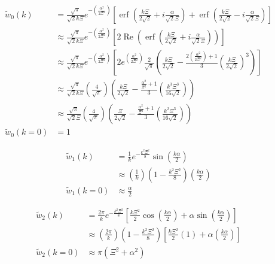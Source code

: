 \documentclass[double,12pt]{revtex4-2}
\begin{document}
\begin{align}
    \widetilde{w}_0(k) &= \frac{\sqrt{\pi}}{\sqrt{2}k\Xi}e^{-\left(
    \frac{\alpha^2}{2\Xi^2}\right)}\left[\operatorname{erf}
    \left(\frac{k\Xi}{2\sqrt{2}}+i\frac{\alpha}{\sqrt{2}\Xi}\right)
    +\operatorname{erf}\left(\frac{k\Xi}{2\sqrt{2}}-i\frac{\alpha}
    {\sqrt{2}\Xi}\right)\right] \\
    & \approx   \frac{\sqrt{\pi}}{\sqrt{2}k\Xi}e^{-\left(\frac{\alpha^2}
    {2\Xi^2}\right)}\left[2\operatorname{Re}\left(\operatorname{erf}
    \left(\frac{k\Xi}{2\sqrt{2}}+i\frac{\alpha}{\sqrt{2}\Xi}\right)
    \right)\right] \\
    & \approx   \frac{\sqrt{\pi}}{\sqrt{2}k\Xi}e^{-\left(\frac{\alpha^2}
    {2\Xi^2}\right)}\left[2e^{\left(\frac{\alpha^2}{2\Xi^2}\right)}
    \frac{2}{\sqrt{\pi}}\left(\frac{k\Xi}{2\sqrt{2}} -\frac{2\left(
    \frac{\alpha^2}{2\Xi^2}\right)+1}{3}\left(\frac{k\Xi}{2\sqrt{2}}
    \right)^3\right)\right] \\
    & \approx   \frac{\sqrt{\pi}}{\sqrt{2}k\Xi}\left(\frac{4}{\sqrt{\pi}}
    \right)\left(\frac{k\Xi}{2\sqrt{2}} -\frac{\frac{\alpha^2}{\Xi^2}+1}
    {3}\left(\frac{k^3\Xi^3}{16\sqrt{2}}\right)\right) \\
     & \approx   \frac{\sqrt{\pi}}{\sqrt{2}\Xi}\left(\frac{4}{\sqrt{\pi}}
    \right)\left(\frac{\Xi}{2\sqrt{2}} -\frac{\frac{\alpha^2}{\Xi^2}+1}
    {3}\left(\frac{k^2\Xi^3}{16\sqrt{2}}\right)\right) \\
     \widetilde{w}_0(k=0) & = 1
\end{align}

\begin{align}
    \widetilde{w}_1(k) &= \frac{1}{k}e^{-\frac{k^2\Xi^2}{8}}
    \sin\left(\frac{k\alpha}{2}\right)  \\
  & \approx\left(\frac{1}{k}\right)\left(1-\frac{k^2\Xi^2}{8}\right)
  \left(\frac{k\alpha}{2}\right)  \\
  \widetilde{w}_1(k=0) & \approx\frac{\alpha}{2}
\end{align}

\begin{align}
     \widetilde{w}_2(k) &= \frac{2\pi}{k}e^{-\frac{k^2\Xi^2}{8}}
       \left[\frac{k\Xi^2}{2}\cos\left(\frac{k\alpha}{2}\right)
       +\alpha\sin\left(\frac{k\alpha}{2}\right)\right] \\
       &  \approx\left(\frac{2\pi}{k}\right)\left(1-\frac{k^2\Xi^2}{8}
       \right)\left[\frac{k\Xi^2}{2}\left(1\right)+\alpha\left(
       \frac{k\alpha}{2}\right)\right] \\
       \widetilde{w}_2(k=0) & \approx \pi(\Xi^2 + \alpha^2)
\end{align}
\end{document}
